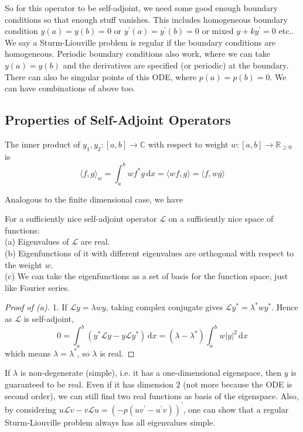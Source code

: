 So for this operator to be self-adjoint, we need some good enough boundary conditions so that enough stuff vanishes.
This includes homogeneous boundary condition $y(a)=y(b)=0$ or $y^\prime(a)=y^\prime(b)=0$ or mixed $y+ky^\prime=0$ etc..
We say a Sturm-Liouville problem is regular if the boundary conditions are homogeneous.
Periodic boundary conditions also work, where we can take $y(a)=y(b)$ and the derivatives are specified (or periodic) at the boundary.
There can also be singular points of this ODE, where $p(a)=p(b)=0$.
We can have combinations of above too.
\subsection{Properties of Self-Adjoint Operators}
\begin{definition}
    The inner product of $y_1,y_2:[a,b]\to\mathbb C$ with respect to weight $w:[a,b]\to\mathbb R_{\ge 0}$ is
    $$\langle f,g\rangle_w=\int_a^bwf^*g\,\mathrm dx=\langle wf,g\rangle=\langle f,wg\rangle$$
\end{definition}
Analogous to the finite dimensional case, we have
\begin{theorem}\label{self-adjoint}
    For a sufficiently nice self-adjoint operator $\mathcal L$ on a sufficiently nice space of functions:\\
    (a) Eigenvalues of $\mathcal L$ are real.\\
    (b) Eigenfunctions of it with different eigenvalues are orthogonal with respect to the weight $w$.\\
    (c) We can take the eigenfunctions as a set of basis for the function space, just like Fourier series.
\end{theorem}
\begin{proof}[Proof of (a)]
    1. If $\mathcal Ly=\lambda wy$, taking complex conjugate gives $\mathcal Ly^*=\lambda^*wy^*$.
    Hence as $\mathcal L$ is self-adjoint,
    $$0=\int_a^b(y^*\mathcal Ly-y\mathcal Ly^*)\,\mathrm dx=(\lambda-\lambda^*)\int_a^bw|y|^2\,\mathrm dx$$
    which means $\lambda=\lambda^*$, so $\lambda$ is real.
\end{proof}
If $\lambda$ is non-degenerate (simple), i.e. it has a one-dimensional eigenspace, then $y$ is guaranteed to be real.
Even if it has dimension $2$ (not more because the ODE is second order), we can still find two real functions as basis of the eigenspace.
Also, by considering $u\mathcal Lv-v\mathcal Lu=(-p(uv^\prime-u^\prime v))^\prime$, one can show that a regular Sturm-Liouville problem always has all eigenvalues simple.
